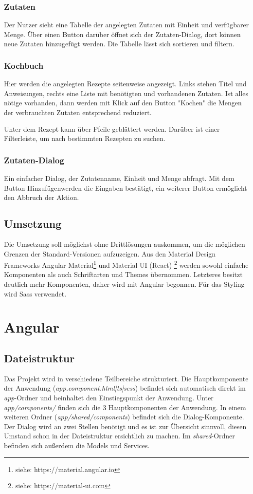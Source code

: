 \subsubsection{Zutaten}
Der Nutzer sieht eine Tabelle der angelegten Zutaten mit Einheit und verfügbarer Menge. Über einen Button darüber öffnet sich der Zutaten-Dialog, dort können neue Zutaten hinzugefügt werden. Die Tabelle lässt sich sortieren und filtern.

\subsubsection{Kochbuch}
Hier werden die angelegten Rezepte seitenweise angezeigt. Links stehen Titel und Anweisungen, rechts eine Liste mit benötigten und vorhandenen Zutaten. Ist alles nötige vorhanden, dann werden mit Klick auf den Button "Kochen" die Mengen der verbrauchten Zutaten entsprechend reduziert.

Unter dem Rezept kann über Pfeile geblättert werden. Darüber ist einer Filterleiste, um nach bestimmten Rezepten zu suchen.

\subsubsection{Zutaten-Dialog}
Ein einfacher Dialog, der Zutatenname, Einheit und Menge abfragt. Mit dem Button \glqq Hinzufügen\grqq werden die Eingaben bestätigt, ein weiterer Button ermöglicht den Abbruch der Aktion.

\subsection{Umsetzung}
Die Umsetzung soll möglichst ohne Drittlösungen auskommen, um die möglichen Grenzen der Standard-Versionen aufzuzeigen. Aus den Material Design Frameworks Angular Material\footnote{siehe: https://material.angular.io} und Material UI (React) \footnote{siehe: https://material-ui.com} werden sowohl einfache Komponenten als auch Schriftarten und Themes übernommen. Letzteres besitzt deutlich mehr Komponenten, daher wird mit Angular begonnen. Für das Styling wird Sass verwendet.

\section{Angular}
\subsection{Dateistruktur}
Das Projekt wird in verschiedene Teilbereiche strukturiert. Die Hauptkomponente der Anwendung (\textit{app.component.html|ts|scss}) befindet sich automatisch direkt im \textit{app}-Ordner und beinhaltet den Einstiegspunkt der Anwendung. Unter \textit{app/components/} finden sich die 3 Hauptkomponenten der Anwendung. In einem weiteren Ordner (\textit{app/shared/components}) befindet sich die Dialog-Komponente. Der Dialog wird an zwei Stellen benötigt und es ist zur Übersicht sinnvoll, diesen Umstand schon in der Dateistruktur ersichtlich zu machen. Im \textit{shared}-Ordner befinden sich außerdem die Models und Services. 

